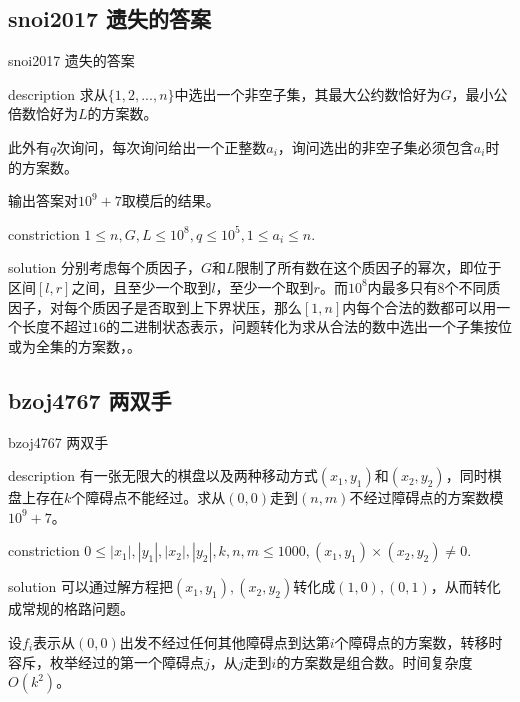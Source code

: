 \documentclass{beamer}
\begin{document}
	\subsection{snoi2017 遗失的答案}
	\begin{frame}{snoi2017 遗失的答案}
		\begin{block}{description}
			求从$\{1,2,...,n\}$中选出一个非空子集，其最大公约数恰好为$G$，最小公倍数恰好为$L$的方案数。
			
			此外有$q$次询问，每次询问给出一个正整数$a_i$，询问选出的非空子集必须包含$a_i$时的方案数。
			
			输出答案对$10^9+7$取模后的结果。
		\end{block}
		\begin{block}{constriction}
			$1 \le n, G, L \le 10^8, q \le 10^5, 1 \le a_i \le n.$
		\end{block}
		\pause
		\begin{block}{solution}
			分别考虑每个质因子，$G$和$L$限制了所有数在这个质因子的幂次，即位于区间$[l,r]$之间，且至少一个取到$l$，至少一个取到$r$。而$10^8$内最多只有$8$个不同质因子，对每个质因子是否取到上下界状压，那么$[1,n]$内每个合法的数都可以用一个长度不超过$16$的二进制状态表示，问题转化为求从合法的数中选出一个子集按位或为全集的方案数，\href{https://files.cnblogs.com/files/zhoushuyu/sol.pdf}{\color{pink}{可以参考这里的题解}}。
		\end{block}
	\end{frame}
	\subsection{bzoj4767 两双手}
	\begin{frame}{bzoj4767 两双手}
		\begin{block}{description}
			有一张无限大的棋盘以及两种移动方式$(x_1,y_1)$和$(x_2,y_2)$，同时棋盘上存在$k$个障碍点不能经过。求从$(0,0)$走到$(n,m)$不经过障碍点的方案数模$10^9+7$。
		\end{block}
		\begin{block}{constriction}
			$0 \le |x_1|, |y_1|, |x_2|, |y_2|, k, n, m \le 1000, (x_1,y_1)\times (x_2,y_2) \neq 0.$
		\end{block}
		\pause
		\begin{block}{solution}
			可以通过解方程把$(x_1,y_1),(x_2,y_2)$转化成$(1,0),(0,1)$，从而转化成常规的格路问题。
			
			设$f_i$表示从$(0,0)$出发不经过任何其他障碍点到达第$i$个障碍点的方案数，转移时容斥，枚举经过的第一个障碍点$j$，从$j$走到$i$的方案数是组合数。时间复杂度$O(k^2)$。
		\end{block}
	\end{frame}
\end{document}
